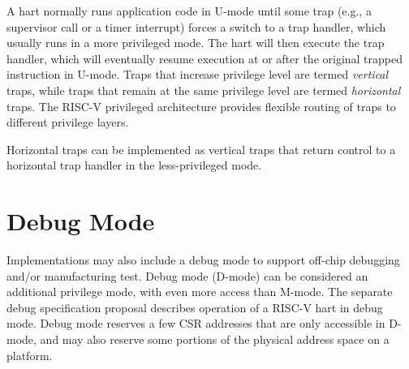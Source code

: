 A hart normally runs application code in U-mode until some trap (e.g.,
a supervisor call or a timer interrupt) forces a switch to a trap
handler, which usually runs in a more privileged mode. The hart will
then execute the trap handler, which will eventually resume execution
at or after the original trapped instruction in U-mode.  Traps that
increase privilege level are termed {\em vertical} traps, while traps
that remain at the same privilege level are termed {\em horizontal}
traps.  The RISC-V privileged architecture provides flexible routing
of traps to different privilege layers.

\begin{commentary}
Horizontal traps can be implemented as vertical traps that
return control to a horizontal trap handler in the less-privileged mode.
\end{commentary}

\section{Debug Mode}

Implementations may also include a debug mode to support off-chip
debugging and/or manufacturing test.  Debug mode (D-mode) can be
considered an additional privilege mode, with even more access than
M-mode. The separate debug specification proposal describes operation
of a RISC-V hart in debug mode.  Debug mode reserves a few CSR
addresses that are only accessible in D-mode, and may also reserve
some portions of the physical address space on a platform.
